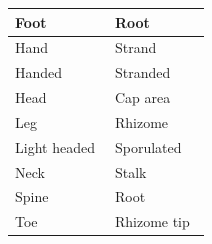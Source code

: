 \begin{longtable}{|>{\RaggedRight}p{0.48005\linewidth}|>{\RaggedRight}p{0.46281\linewidth}|}
\hspace*{0pt}\ignorespaces{}\hspace*{0pt}Foot&\hspace*{0pt}\ignorespaces{}\hspace*{0pt}Root\\ \hline \hspace*{0pt}\ignorespaces{}\hspace*{0pt}Hand&\hspace*{0pt}\ignorespaces{}\hspace*{0pt}Strand\\ \hline \hspace*{0pt}\ignorespaces{}\hspace*{0pt}Handed&\hspace*{0pt}\ignorespaces{}\hspace*{0pt}Stranded\\ \hline \hspace*{0pt}\ignorespaces{}\hspace*{0pt}Head&\hspace*{0pt}\ignorespaces{}\hspace*{0pt}Cap area\\ \hline \hspace*{0pt}\ignorespaces{}\hspace*{0pt}Leg&\hspace*{0pt}\ignorespaces{}\hspace*{0pt}Rhizome\\ \hline \hspace*{0pt}\ignorespaces{}\hspace*{0pt}Light headed&\hspace*{0pt}\ignorespaces{}\hspace*{0pt}Sporulated\\ \hline \hspace*{0pt}\ignorespaces{}\hspace*{0pt}Neck&\hspace*{0pt}\ignorespaces{}\hspace*{0pt}Stalk\\ \hline \hspace*{0pt}\ignorespaces{}\hspace*{0pt}Spine&\hspace*{0pt}\ignorespaces{}\hspace*{0pt}Root\\ \hline \hspace*{0pt}\ignorespaces{}\hspace*{0pt}Toe&\hspace*{0pt}\ignorespaces{}\hspace*{0pt}Rhizome tip\\ \hline 
\end{longtable}

